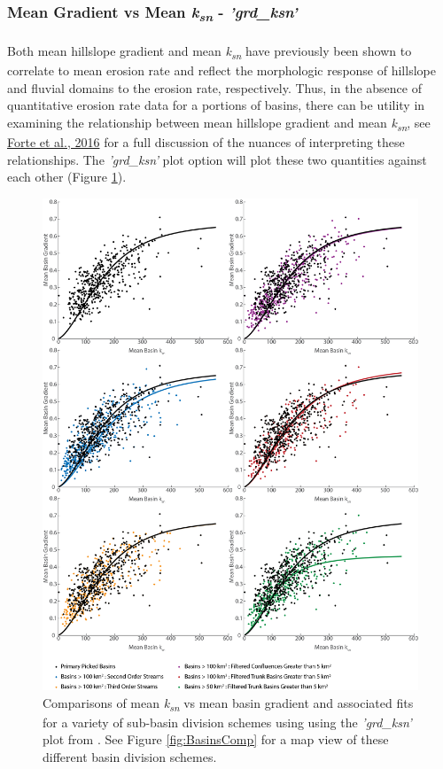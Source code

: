 \subsubsection{Mean Gradient vs Mean \textit{k\textsubscript{sn}} - \textit{'grd\_ksn'}} \label{sec:grdksn}
\paragraph{}Both mean hillslope gradient and mean \textit{k\textsubscript{sn}} have previously been shown to correlate to mean erosion rate  and reflect the morphologic response of hillslope and fluvial domains to the erosion rate, respectively. Thus, in the absence of quantitative erosion rate data for a portions of basins, there can be utility in examining the relationship between mean hillslope gradient and mean \textit{k\textsubscript{sn}}, see \href{https://www.sciencedirect.com/science/article/pii/S0012821X16303004}{Forte et al., 2016} for a full discussion of the nuances of interpreting these relationships. The \textit{'grd\_ksn'} plot option will plot these two quantities against each other (Figure \ref{fig:GrdKsnComp}). 

\begin{figure}[H]
	\centering
	\includegraphics[width=13cm]{PNGs/grd_ksn_basinCompare.png}
	\caption{Comparisons of mean \textit{k\textsubscript{sn}} vs mean basin gradient and associated fits  for a variety of sub-basin division schemes using  using the \textit{'grd\_ksn'} plot from . See Figure \ref{fig:BasinsComp} for a map view of these different basin division schemes.}
	\label{fig:GrdKsnComp}
\end{figure}


